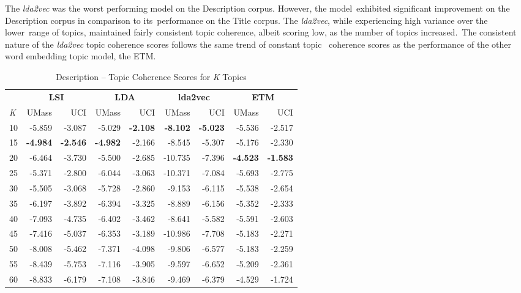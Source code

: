 \documentclass[letterpaper,12pt]{article}
\begin{document}
The \emph{lda2vec} was the worst performing model on the Description corpus. However, the model\
exhibited significant improvement on the Description corpus in comparison to its\
performance on the Title corpus. The \emph{lda2vec}, while experiencing high variance over the lower\
range of topics, maintained fairly consistent topic coherence, albeit scoring low, as the number of topics increased.\
The consistent nature of the \emph{lda2vec} topic coherence scores follows the same trend of constant topic \
coherence scores as the performance of the other word embedding topic model, the ETM.

\begin{table}
	\caption{\label{tab:combo_description_tc} Description -- Topic Coherence Scores for \emph{K} Topics}
	\begin{center}
		\begin{tabular}{|l|rr|rr|rr|rr|}
			\hline
			{} & \multicolumn{2}{c|}{\textbf{LSI}} & \multicolumn{2}{c|}{\textbf{LDA}} & \multicolumn{2}{c|}{\textbf{lda2vec}} & \multicolumn{2}{c|}{\textbf{ETM}} \\
			\emph{K} &   UMass &    UCI &  UMass &    UCI &   UMass &    UCI &  UMass &    UCI \\
			\hline
			10  &  -5.859 & -3.087 & -5.029 & \textbf{-2.108} &  \textbf{-8.102} & \textbf{-5.023} & -5.536 & -2.517 \\
			15  &  \textbf{-4.984} & \textbf{-2.546} & \textbf{-4.982} & -2.166 &  -8.545 & -5.307 & -5.176 & -2.330 \\
			20  &  -6.464 & -3.730 & -5.500 & -2.685 & -10.735 & -7.396 & \textbf{-4.523} & \textbf{-1.583} \\
			25  &  -5.371 & -2.800 & -6.044 & -3.063 & -10.371 & -7.084 & -5.693 & -2.775 \\
			30  &  -5.505 & -3.068 & -5.728 & -2.860 &  -9.153 & -6.115 & -5.538 & -2.654 \\
			35  &  -6.197 & -3.892 & -6.394 & -3.325 &  -8.889 & -6.156 & -5.352 & -2.333 \\
			40  &  -7.093 & -4.735 & -6.402 & -3.462 &  -8.641 & -5.582 & -5.591 & -2.603 \\
			45  &  -7.416 & -5.037 & -6.353 & -3.189 & -10.986 & -7.708 & -5.183 & -2.271 \\
			50  &  -8.008 & -5.462 & -7.371 & -4.098 &  -9.806 & -6.577 & -5.183 & -2.259 \\
			55  &  -8.439 & -5.753 & -7.116 & -3.905 &  -9.597 & -6.652 & -5.209 & -2.361 \\
			60  &  -8.833 & -6.179 & -7.108 & -3.846 &  -9.469 & -6.379 & -4.529 & -1.724 \\

\end{tabular}
\end{center}
\end{table}
\end{document}
